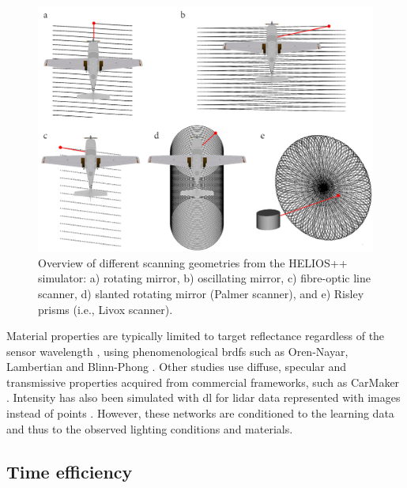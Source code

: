 \begin{figure}[ht]
	\includegraphics[width=\linewidth]{figs/context/scan_geometries_lidar.png}
	\caption{Overview of different scanning geometries from the HELIOS++ simulator: a) rotating mirror, b) oscillating mirror, c) fibre-optic line scanner, d) slanted rotating mirror (Palmer scanner), and e) Risley prisms (i.e., Livox scanner). }
    \label{fig:scan_geometries_lidar}
\end{figure}

Material properties are typically limited to target reflectance regardless of the sensor wavelength \cite{chen_analysis_2022, gschwandtner_blensor_2011, zohdi_rapid_2020}, using phenomenological \acrshort{brdf}s such as Oren-Nayar, Lambertian and Blinn-Phong \cite{chen_analysis_2022}. Other studies use diffuse, specular and transmissive properties acquired from commercial frameworks, such as CarMaker \cite{haider_development_2022}. Intensity has also been simulated with \acrshort{dl} for \acrshort{lidar} data represented with images instead of points \cite{vacek_learning_2022, xiao_synlidar_2021}. However, these networks are conditioned to the learning data and thus to the observed lighting conditions and materials. 

\subsection{Time efficiency}

